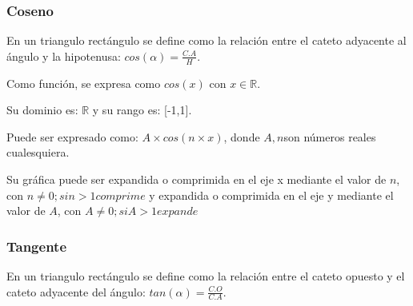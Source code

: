 \subsubsection{Coseno} \label{Cos}
En un triangulo rectángulo se define como la relación entre el cateto adyacente al
ángulo y la hipotenusa: $ cos(\alpha)= \frac{C.A}{H} $.

Como función, se expresa como $ cos(x) \text{ con  }x\in\mathbb{R} $.

Su dominio es: $ \mathbb{R} $ y su rango es: [-1,1].

Puede ser expresado como: $ A\times cos(n\times x) $, donde $A,n$son números reales
cualesquiera.

Su gráfica puede ser expandida o comprimida en el eje x mediante el valor de $n$,
con $ n \not = 0; si n>1 comprime $  y  expandida o comprimida en el eje y
mediante el valor de $ A $, con $ A \not = 0; si A>1 expande $




\begin{center}
\end{center}




\subsubsection{Tangente} \label{Tan}
En un triangulo rectángulo se define como la relación entre el cateto opuesto y
el cateto adyacente del ángulo: $ tan(\alpha)= \frac{C.O}{C.A} $.

